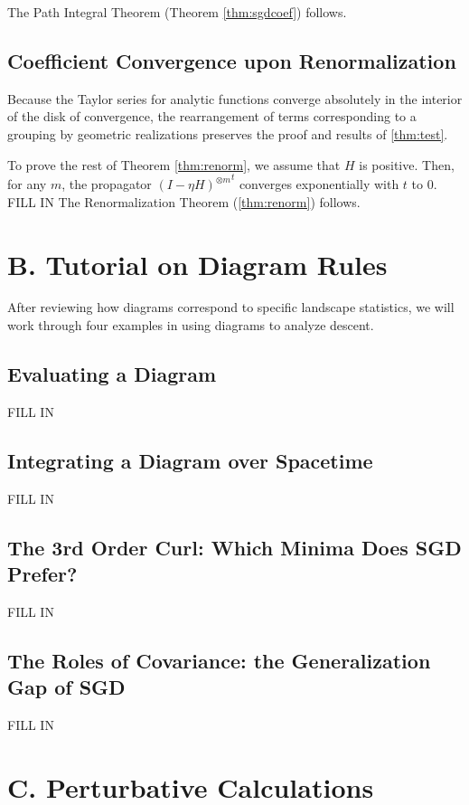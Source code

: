 \documentclass{article}
\begin{document}
            The Path Integral Theorem (Theorem \ref{thm:sgdcoef}) follows.

    \subsection*{Coefficient Convergence upon Renormalization}
        Because the Taylor series for analytic functions converge absolutely
        in the interior of the disk of convergence, the rearrangement of terms
        corresponding to a grouping by geometric realizations preserves the
        proof and results of \ref{thm:test}.  

        To prove the rest of Theorem \ref{thm:renorm}, we assume that $H$ is
        positive.  Then, for any $m$, the propagator ${(I-\eta H)^{\otimes
        m}}^t$ converges exponentially with $t$ to $0$.
        {\color{moor} FILL IN}
        The Renormalization Theorem (\ref{thm:renorm}) follows.

\section*{B. Tutorial on Diagram Rules}
    After reviewing how diagrams correspond to specific landscape statistics,
    we will work through four examples in using diagrams to analyze descent.

    \subsection*{Evaluating a Diagram}
        {\color{moor} FILL IN}
    \subsection*{Integrating a Diagram over Spacetime}
        {\color{moor} FILL IN}
    \subsection*{The 3rd Order Curl: Which Minima Does SGD Prefer?}
        {\color{moor} FILL IN}
    \subsection*{The Roles of Covariance: the Generalization Gap of SGD}
        {\color{moor} FILL IN}
        
\section*{C. Perturbative Calculations}
\end{document}
